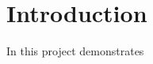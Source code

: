 \documentclass[Main]{subfiles}
\begin{document}
\section{Introduction} %
\label{sec:introduction}
In this project demonstrates 


\end{document}
